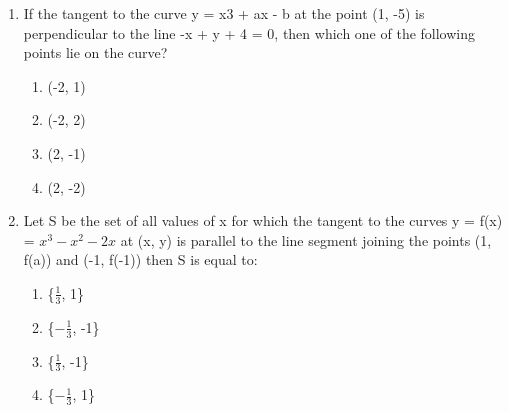 \begin{enumerate}[label=\arabic*.,ref=\thesubsection.\theenumi]
\item If the tangent to the curve y = x3 + ax - b at the point (1, -5) is perpendicular to the line -x + y + 4 = 0, then which one of the following points lie on the curve?
\begin{enumerate}
\item (-2, 1)
\item (-2, 2)
\item (2, -1)
\item (2, -2)
\end{enumerate}

\item Let S be the set of all values of x for which the tangent to the curves y = f(x) = $x^3 - x^2 - 2x$ at (x, y) is parallel to the line segment joining the points (1, f(a)) and (-1, f(-1)) then S is equal to: 
\begin{enumerate}
\item \{$\frac{1}{3}$, 1\}
\item \{$-\frac{1}{3}$, -1\}
\item \{$\frac{1}{3}$, -1\}
\item \{$-\frac{1}{3}$, 1\}
\end{enumerate}

\end{enumerate}

